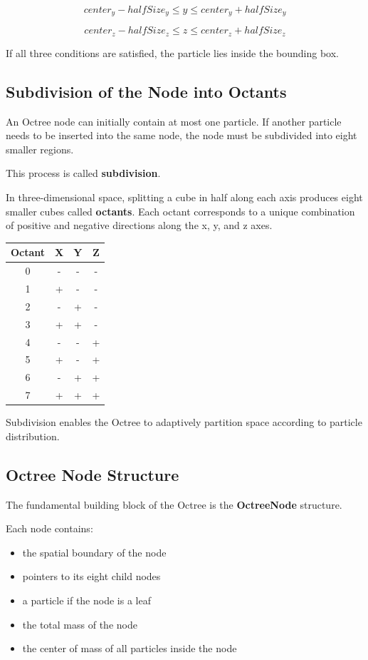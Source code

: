 \[
center_y - halfSize_y \le y \le center_y + halfSize_y
\]

\[
center_z - halfSize_z \le z \le center_z + halfSize_z
\]

If all three conditions are satisfied, the particle lies inside the bounding box.

\subsection{Subdivision of the Node into Octants}

An Octree node can initially contain at most one particle. If another particle needs to be inserted into the same node, the node must be subdivided into eight smaller regions.

This process is called \textbf{subdivision}.

In three-dimensional space, splitting a cube in half along each axis produces eight smaller cubes called \textbf{octants}. Each octant corresponds to a unique combination of positive and negative directions along the x, y, and z axes.

\begin{center}
\begin{tabular}{c c c c}
Octant & X & Y & Z \\
\hline
0 & - & - & - \\
1 & + & - & - \\
2 & - & + & - \\
3 & + & + & - \\
4 & - & - & + \\
5 & + & - & + \\
6 & - & + & + \\
7 & + & + & + \\
\end{tabular}
\end{center}

Subdivision enables the Octree to adaptively partition space according to particle distribution.

\subsection{Octree Node Structure}

The fundamental building block of the Octree is the \textbf{OctreeNode} structure.

Each node contains:

\begin{itemize}
\item the spatial boundary of the node
\item pointers to its eight child nodes
\item a particle if the node is a leaf
\item the total mass of the node
\item the center of mass of all particles inside the node
\end{itemize}

